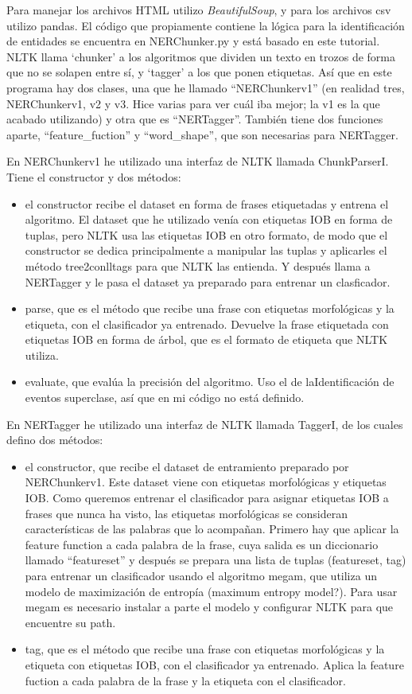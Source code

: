 \documentclass{pre-tfg}
\begin{document}
Para manejar los archivos HTML utilizo \textit{BeautifulSoup}, y para los archivos csv utilizo pandas.
El código que propiamente contiene la lógica para la identificación de entidades se encuentra en NERChunker.py y está basado en este tutorial. NLTK llama ‘chunker’ a los algoritmos que dividen un texto en trozos de forma que no se solapen entre sí, y ‘tagger’ a los que ponen etiquetas. Así que en este programa hay dos clases, una que he llamado “NERChunkerv1” (en realidad tres, NERChunkerv1, v2 y v3. Hice varias para ver cuál iba mejor; la v1 es la que acabado utilizando) y otra que es “NERTagger”. También tiene dos funciones aparte, “feature\_fuction” y “word\_shape”, que son necesarias para NERTagger.

En NERChunkerv1 he utilizado una interfaz de NLTK llamada ChunkParserI. Tiene el constructor y dos métodos:
\begin{itemize}
	\item el constructor recibe el dataset en forma de frases etiquetadas y entrena el algoritmo. El dataset que he utilizado venía con etiquetas IOB en forma de tuplas, pero NLTK usa las etiquetas IOB en otro formato, de modo que el constructor se dedica principalmente a manipular las tuplas y aplicarles el método tree2conlltags para que NLTK las entienda. Y después llama a NERTagger y le pasa el dataset ya preparado para entrenar un clasficador.
	\item parse, que es el método que recibe una frase con etiquetas morfológicas y la etiqueta, con el clasificador ya entrenado. Devuelve la frase etiquetada con etiquetas IOB en forma de árbol, que es el formato de etiqueta que NLTK utiliza.
	\item evaluate, que evalúa la precisión del algoritmo. Uso el de laIdentificación de eventos superclase, así que en mi código no está definido.
\end{itemize}


En NERTagger he utilizado una interfaz de NLTK llamada TaggerI, de los cuales defino dos métodos:

\begin{itemize}
	\item el constructor, que recibe el dataset de entramiento preparado por NERChunkerv1. Este dataset viene con etiquetas morfológicas y etiquetas IOB. Como queremos entrenar el clasificador para asignar etiquetas IOB a frases que nunca ha visto, las etiquetas morfológicas se consideran características de las palabras que lo acompañan. Primero hay que aplicar la feature function a cada palabra de la frase, cuya salida es un diccionario llamado “featureset” y después se prepara una lista de tuplas (featureset, tag) para entrenar un clasificador usando el algoritmo megam, que utiliza un modelo de maximización de entropía (maximum entropy model?). Para usar megam es necesario instalar a parte el modelo y configurar NLTK para que encuentre su path.
	\item tag, que es el método que recibe una frase con etiquetas morfológicas y la etiqueta con etiquetas IOB, con el clasificador ya entrenado. Aplica la feature fuction a cada palabra de la frase y la etiqueta con el clasificador.
\end{itemize}
\end{document}
